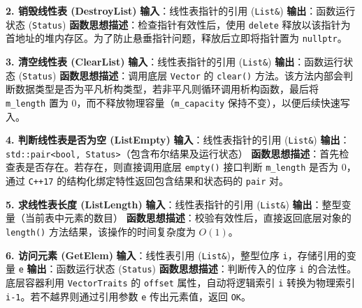 \documentclass[supercite]{Experimental_Report}
\theoremstyle{definition}
\begin{document}
\vspace{0.5em}
\noindent\textbf{2. 销毁线性表 (DestroyList)}
\newline\textbf{输入}：线性表指针的引用 (\texttt{List\&})
\newline\textbf{输出}：函数运行状态 (\texttt{Status})
\newline\textbf{函数思想描述}：检查指针有效性后，使用 \texttt{delete} 释放以该指针为首地址的堆内存区。为了防止悬垂指针问题，释放后立即将指针置为 \texttt{nullptr}。

\vspace{0.5em}
\noindent\textbf{3. 清空线性表 (ClearList)}
\newline\textbf{输入}：线性表指针的引用 (\texttt{List\&})
\newline\textbf{输出}：函数运行状态 (\texttt{Status})
\newline\textbf{函数思想描述}：调用底层 \texttt{Vector} 的 \texttt{clear()} 方法。该方法内部会判断数据类型是否为平凡析构类型，若非平凡则循环调用析构函数，最后将 \texttt{m\_length} 置为 0，而不释放物理容量（\texttt{m\_capacity} 保持不变），以便后续快速写入。

\vspace{0.5em}
\noindent\textbf{4. 判断线性表是否为空 (ListEmpty)}
\newline\textbf{输入}：线性表指针的引用 (\texttt{List\&})
\newline\textbf{输出}：\texttt{std::pair<bool, Status>}（包含布尔结果及运行状态）
\newline\textbf{函数思想描述}：首先检查表是否存在。若存在，则直接调用底层 \texttt{empty()} 接口判断 \texttt{m\_length} 是否为 0，通过 \texttt{C++17} 的结构化绑定特性返回包含结果和状态码的 \texttt{pair} 对。

\vspace{0.5em}
\noindent\textbf{5. 求线性表长度 (ListLength)}
\newline\textbf{输入}：线性表指针的引用 (\texttt{List\&})
\newline\textbf{输出}：整型变量（当前表中元素的数目）
\newline\textbf{函数思想描述}：校验有效性后，直接返回底层对象的 \texttt{length()} 方法结果，该操作的时间复杂度为 $O(1)$。

\vspace{0.5em}
\noindent\textbf{6. 访问元素 (GetElem)}
\newline\textbf{输入}：线性表引用 (\texttt{List\&})，整型位序 \texttt{i}，存储引用的变量 \texttt{e}
\newline\textbf{输出}：函数运行状态 (\texttt{Status})
\newline\textbf{函数思想描述}：判断传入的位序 \texttt{i} 的合法性。底层容器利用 \texttt{VectorTraits} 的 \texttt{offset} 属性，自动将逻辑索引 \texttt{i} 转换为物理索引 \texttt{i-1}。若不越界则通过引用参数 \texttt{e} 传出元素值，返回 \texttt{OK}。
\end{document}

